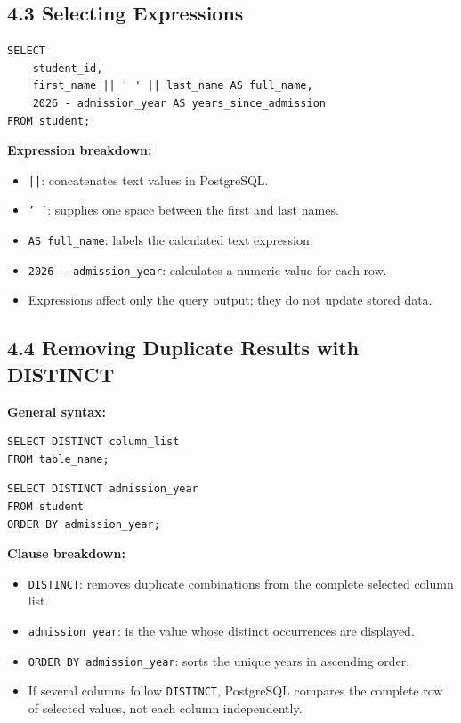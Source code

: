 \documentclass[12pt,a4paper]{article}
\begin{document}
\subsection*{4.3 Selecting Expressions}
\begin{verbatim}
SELECT
    student_id,
    first_name || ' ' || last_name AS full_name,
    2026 - admission_year AS years_since_admission
FROM student;
\end{verbatim}

\noindent\textbf{Expression breakdown:}
\begin{itemize}
    \item \texttt{||}: concatenates text values in PostgreSQL.
    \item \texttt{' '}: supplies one space between the first and last names.
    \item \texttt{AS full\_name}: labels the calculated text expression.
    \item \texttt{2026 - admission\_year}: calculates a numeric value for each row.
    \item Expressions affect only the query output; they do not update stored data.
\end{itemize}

\subsection*{4.4 Removing Duplicate Results with DISTINCT}
\noindent\textbf{General syntax:}
\begin{verbatim}
SELECT DISTINCT column_list
FROM table_name;
\end{verbatim}

\begin{verbatim}
SELECT DISTINCT admission_year
FROM student
ORDER BY admission_year;
\end{verbatim}

\noindent\textbf{Clause breakdown:}
\begin{itemize}
    \item \texttt{DISTINCT}: removes duplicate combinations from the complete selected column list.
    \item \texttt{admission\_year}: is the value whose distinct occurrences are displayed.
    \item \texttt{ORDER BY admission\_year}: sorts the unique years in ascending order.
    \item If several columns follow \texttt{DISTINCT}, PostgreSQL compares the complete row of
    selected values, not each column independently.
\end{itemize}
\end{document}
